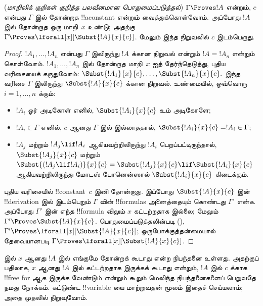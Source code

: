 \documentclass[11pt,a4paper,openany]{memoir}
\begin{document}
\begin{thm} (\emph{மாறிலிக் குறிகள் குறித்த பலவீனமான
பொதுமைப்படுத்தல்})
$\Gamma \Proves !A$ என்றும், $c$ என்பது $\Gamma$ இல் தோன்றாத
!!a{constant} என்றும் வைத்துக்கொள்வோம். அப்போது $!A$ இல் தோன்றாத
ஒரு மாறி~$x$ உண்டு; அதற்கு $\Gamma \Proves
\lforall[x][\Subst{!A}{x}{c}]$. மேலும் இந்த நிறுவலில் $c$ இடம்பெறாது.
\end{thm}

\begin{proof} $!A_1,\ldots,!A_n$ என்பது $\Gamma$ இலிருந்து $!A$ க்கான
நிறுவல் என்றும் $!A=!A_n$ என்றும் கொள்வோம். $!A_1,\ldots,!A_n$ இல்
தோன்றாத மாறி~$x$ ஐத் தேர்ந்தெடுத்து, புதிய வரிசையைக் கருதுவோம்:
$\Subst{!A_1}{x}{c},\ldots,\Subst{!A_n}{x}{c}.$
இந்த வரிசை $\Gamma$ இலிருந்து $\Subst{!A}{x}{c}$ க்கான நிறுவல்.
உண்மையில், ஒவ்வொரு $i=1,\ldots,n$ க்கும்:
\begin{itemize}
\item $!A_i$ ஓர் அடிகோள் எனில், $\Subst{!A_i}{x}{c}$ உம் அடிகோளே;
\item $!A_i \in \Gamma$ எனில், $c$ ஆனது $\Gamma$ இல் இல்லாததால்,
$\Subst{!A_i}{x}{c} = !A_i \in \Gamma$;
\item $!A_j$ மற்றும் $!A_j \lif !A_i$ ஆகியவற்றிலிருந்து $!A_i$
பெறப்பட்டிருந்தால், $\Subst{!A_j}{x}{c}$ மற்றும்
$\Subst{(!A_j \lif !A_i)}{x}{c}
= \Subst{!A_j}{x}{c} \lif \Subst{!A_i}{x}{c}$ ஆகியவற்றிலிருந்து
மோடஸ் போனென்ஸால் $\Subst{!A_i}{x}{c}$ கிடைக்கும்.
\end{itemize}
புதிய வரிசையில் !!{constant}~$c$ இனி தோன்றாது. இப்போது
$\Subst{!A}{x}{c}$ இன் !!{derivation} இல் இடம்பெறும் $\Gamma$ வின்
!!{formula}s அனைத்தையும் கொண்டது $\Gamma'$ என்க. அப்போது $\Gamma'$ இன்
எந்த !!{formula} விலும் $x$ கட்டற்றதாக இல்லை; மேலும் $\Gamma'
\Proves \Subst{!A}{x}{c}$. பொதுமைப்படுத்தலின்படி
(), $\Gamma'
\Proves \lforall[x][\Subst{!A}{x}{c}]$; ஒருபோக்குத்தன்மையால்
தேவையானபடி $\Gamma \Proves \lforall[x][\Subst{!A}{x}{c}]$.
\end{proof}

\begin{explain}
 இல் $x$ ஆனது $!A$ இல் எங்குமே தோன்றக் கூடாது
என்ற நிபந்தனை உள்ளது. அதற்குப் பதிலாக, $x$ ஆனது $!A$ இல் கட்டற்றதாக
இருக்கக் கூடாது என்றும், $!A$ இல் $c$ க்காக !!{free for} ஆக இருக்க
வேண்டும் என்றும் கூறும் மெலிந்த நிபந்தனைகளைப் பெறுவதே நமது நோக்கம்.
கட்டுண்ட !!{variable} யை மாற்றுவதன் மூலம் இதைச் செய்யலாம்; அதை முதலில்
நிறுவுவோம்.
\end{explain}
\end{document}
